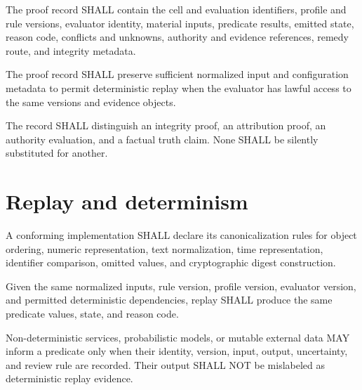 \begin{requirement}[ACA-120-037]
The proof record SHALL contain the cell and evaluation identifiers, profile and
rule versions, evaluator identity, material inputs, predicate results, emitted
state, reason code, conflicts and unknowns, authority and evidence references,
remedy route, and integrity metadata.
\end{requirement}

\begin{requirement}[ACA-120-038]
The proof record SHALL preserve sufficient normalized input and configuration
metadata to permit deterministic replay when the evaluator has lawful access to
the same versions and evidence objects.
\end{requirement}

\begin{requirement}[ACA-120-039]
The record SHALL distinguish an integrity proof, an attribution proof, an
authority evaluation, and a factual truth claim. None SHALL be silently
substituted for another.
\end{requirement}

\section{Replay and determinism}

\begin{requirement}[ACA-120-040]
A conforming implementation SHALL declare its canonicalization rules for object
ordering, numeric representation, text normalization, time representation,
identifier comparison, omitted values, and cryptographic digest construction.
\end{requirement}

\begin{requirement}[ACA-120-041]
Given the same normalized inputs, rule version, profile version, evaluator
version, and permitted deterministic dependencies, replay SHALL produce the
same predicate values, state, and reason code.
\end{requirement}

\begin{requirement}[ACA-120-042]
Non-deterministic services, probabilistic models, or mutable external data MAY
inform a predicate only when their identity, version, input, output, uncertainty,
and review rule are recorded. Their output SHALL NOT be mislabeled as
deterministic replay evidence.
\end{requirement}

